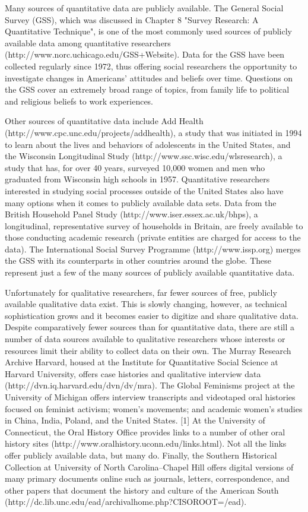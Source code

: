Many sources of quantitative data are publicly available. The General Social Survey (GSS), which was discussed in Chapter 8 "Survey Research: A Quantitative Technique", is one of the most commonly used sources of publicly available data among quantitative researchers (http://www.norc.uchicago.edu/GSS+Website). Data for the GSS have been collected regularly since 1972, thus offering social researchers the opportunity to investigate changes in Americans’ attitudes and beliefs over time. Questions on the GSS cover an extremely broad range of topics, from family life to political and religious beliefs to work experiences.

Other sources of quantitative data include Add Health (http://www.cpc.unc.edu/projects/addhealth), a study that was initiated in 1994 to learn about the lives and behaviors of adolescents in the United States, and the Wisconsin Longitudinal Study (http://www.ssc.wisc.edu/wlsresearch), a study that has, for over 40 years, surveyed 10,000 women and men who graduated from Wisconsin high schools in 1957. Quantitative researchers interested in studying social processes outside of the United States also have many options when it comes to publicly available data sets. Data from the British Household Panel Study (http://www.iser.essex.ac.uk/bhps), a longitudinal, representative survey of households in Britain, are freely available to those conducting academic research (private entities are charged for access to the data). The International Social Survey Programme (http://www.issp.org) merges the GSS with its counterparts in other countries around the globe. These represent just a few of the many sources of publicly available quantitative data.

Unfortunately for qualitative researchers, far fewer sources of free, publicly available qualitative data exist. This is slowly changing, however, as technical sophistication grows and it becomes easier to digitize and share qualitative data. Despite comparatively fewer sources than for quantitative data, there are still a number of data sources available to qualitative researchers whose interests or resources limit their ability to collect data on their own. The Murray Research Archive Harvard, housed at the Institute for Quantitative Social Science at Harvard University, offers case histories and qualitative interview data (http://dvn.iq.harvard.edu/dvn/dv/mra). The Global Feminisms project at the University of Michigan offers interview transcripts and videotaped oral histories focused on feminist activism; women’s movements; and academic women’s studies in China, India, Poland, and the United States. [1] At the University of Connecticut, the Oral History Office provides links to a number of other oral history sites (http://www.oralhistory.uconn.edu/links.html). Not all the links offer publicly available data, but many do. Finally, the Southern Historical Collection at University of North Carolina–Chapel Hill offers digital versions of many primary documents online such as journals, letters, correspondence, and other papers that document the history and culture of the American South (http://dc.lib.unc.edu/ead/archivalhome.php?CISOROOT=/ead).

